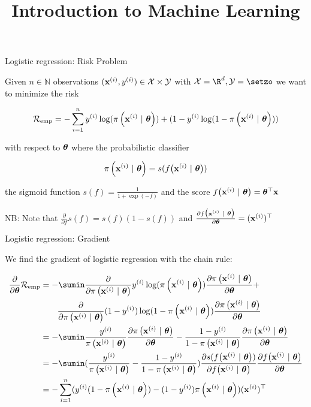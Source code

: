 \documentclass[11pt,compress,t,notes=noshow, xcolor=table]{beamer}
\title{Introduction to Machine Learning}
\begin{document}

\begin{frame}{Logistic regression: Risk Problem}

Given $n \in \mathbb{N}$ observations $(\mathbf{x}^{(i)}, y^{(i)}) \in \mathcal{X} \times \mathcal{Y}$ with  $\Xspace = \R^d, \Yspace = \setzo$ we want to minimize the risk 

$$
\mathcal{R}_{\text{emp}}   = 
-\sum^n_{i=1} y^{(i)}\log(\pi\left(\mathbf{x}^{(i)} ~|~ \bm{\theta}\right)) + (1-y^{(i)}\log(1-\pi\left(\mathbf{x}^{(i)} ~|~ \bm{\theta}\right)))
$$

with respect to $\bm{\theta}$ where the probabilistic classifier

$$
\pi\left(\mathbf{x}^{(i)} ~|~ \bm{\theta}\right) = s(f\big(\mathbf{x}^{(i)} ~|~ \bm{\theta}\big))
$$

the sigmoid function $s(f) = \frac{1}{1 + \exp(-f)}$ and the score $f\big(\mathbf{x}^{(i)} ~|~ \bm{\theta}\big) = \bm{\theta}^\top \mathbf{x}$

\vfill

NB: Note that $\frac{\partial}{\partial f} s(f) = s(f)(1-s(f))$ and $\frac{\partial f\big(\mathbf{x}^{(i)} ~|~ \bm{\theta}\big)}{\partial \bm{\theta}} = (\mathbf{x}^{(i)})^\top$

\end{frame}

\begin{frame}{Logistic regression: Gradient}

We find the gradient of logistic regression with the chain rule:

\vfill

{\small
\begin{align*}
\frac{\partial}{\partial\thetav}\riske  & =  
-\sumin \frac{\partial}{\partial\pixit }\yi\log(\pixit)\frac{\partial\pixit}{\partial \thetav} +  \\
& \qquad \frac{\partial}{\partial\pixit} (1-\yi)\log(1-\pixit)\frac{\partial\pixit}{\partial \thetav}\\
& =  
-\sumin \frac{\yi}{\pixit}\frac{\partial\pixit}{\partial \thetav} -  \frac{1-\yi}{1-\pixit}\frac{\partial\pixit}{\partial \thetav}\\
&=  
-\sumin (\frac{\yi}{\pixit} -  \frac{1-\yi}{1-\pixit})\frac{\partial s(\fxit)}{\partial  \fxit}\frac{\partial  \fxit}{\partial\thetav}\\
&=  
-\sum^n_{i=1} (\yi(1-\pixit)  -  (1-\yi)\pixit )(\xi)^\top\\
\end{align*}
}


\end{frame}
\end{document}
